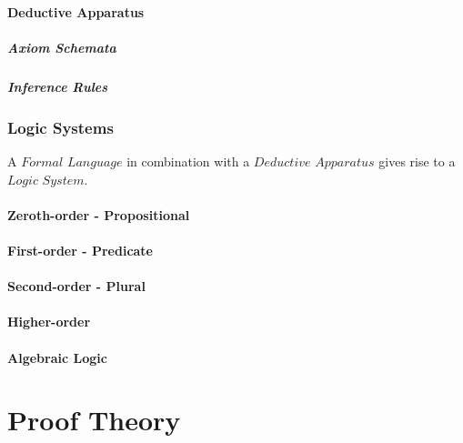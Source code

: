 \documentclass{article}
\begin{document}
\subsection{Deductive Apparatus}

\subsubsection{Axiom Schemata}

\subsubsection{Inference Rules}

\section{Logic Systems}

A $Formal$ $Language$ in combination with a $Deductive$ $Apparatus$
gives rise to a $Logic$ $System$.

\subsection{Zeroth-order - Propositional}

\subsection{First-order - Predicate}

\subsection{Second-order - Plural}

\subsection{Higher-order}

\subsection{Algebraic Logic}



\part{Proof Theory}

\end{document}
